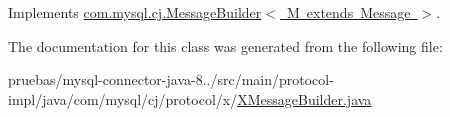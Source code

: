 Implements \mbox{\hyperlink{interfacecom_1_1mysql_1_1cj_1_1_message_builder_a592efa3bace2a15138d4bed34dd37e28}{com.\+mysql.\+cj.\+Message\+Builder$<$ M extends Message $>$}}.



The documentation for this class was generated from the following file\+:\begin{DoxyCompactItemize}
\item 
pruebas/mysql-\/connector-\/java-\/8../src/main/protocol-\/impl/java/com/mysql/cj/protocol/x/\mbox{\hyperlink{_x_message_builder_8java}{X\+Message\+Builder.\+java}}\end{DoxyCompactItemize}
